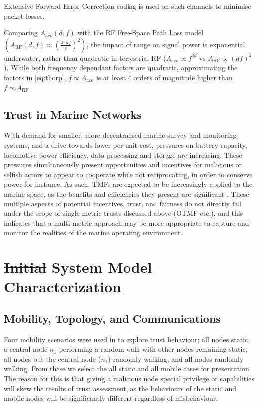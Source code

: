 \documentclass[conference]{IEEEtran}
\providecommand{\DIFdel}[1]{{\protect\color{red}\sout{#1}}}                      %
\providecommand{\DIFaddbegin}{} %
\providecommand{\DIFaddend}{} %
\providecommand{\DIFdelbegin}{} %
\providecommand{\DIFdelend}{} %
\begin{document}
Extensive Forward Error Correction coding is used on such channels to minimise packet losses.

Comparing $A_{aco}(d,f)$ with the RF Free-Space Path Loss model $(A_{\text{RF}}(d,f) \approx \left( \frac{4\pi d f}{c} \right)^2)$, the impact of range on signal power is exponential underwater, rather than quadratic in terrestrial RF ($A_{\text{aco}} \propto f^{2d}$ vs $A_{\text{RF}} \propto (df)^2$). 
While both frequency dependant factors are quadratic, approximating the factors in \eqref{eq:thorp}, $f\propto A_{\text{aco}}$ is at least 4 orders of magnitude higher than $f\propto A_{\text{RF}}$


\subsection{Trust in Marine Networks}\label{sec:trust_in_marine}\DIFaddbegin {}
\DIFaddend 

With demand for smaller, more decentralised marine survey and monitoring systems, and a drive towards lower per-unit cost, pressures on battery capacity, locomotive power efficiency, data processing and storage are increasing.
These pressures simultaneously present opportunities and incentives for malicious or selfish actors to appear to cooperate while not reciprocating, in order to conserve power for instance.
As such, TMFs are expected to be increasingly applied to the marine space, as the benefits and efficiencies they present are significant \cite{Pavan2015}.
These multiple aspects of potential incentives, trust, and fairness do not directly fall under the scope of single metric trusts discussed above (OTMF etc.), and this indicates that a multi-metric approach may be more appropriate to capture and monitor the realities of the marine operating environment.


\section{\DIFdelbegin \DIFdel{Initial }\DIFdelend System Model Characterization}\label{sec:initialsystemcharacterization}

\subsection{Mobility, Topology, and Communications}

Four mobility scenarios were used in \cite{Guo11} to explore trust behaviour; all nodes static, a central node $n_1$ performing a random walk with other nodes remaining static, all nodes but the central node ($n_1$) randomly walking, and all nodes randomly walking. From these we select the all static and all mobile cases for presentation.
The reason for this is that giving a malicious node special privilege or capabilities will skew the results of trust assessment, as the behaviours of the static and mobile nodes will be significantly different regardless of misbehaviour.
\end{document}
